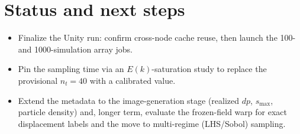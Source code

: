 \documentclass[11pt]{article}
\begin{document}
\section*{Status and next steps}
\begin{itemize}
  \item Finalize the Unity run: confirm cross-node cache reuse, then launch the
        100- and 1000-simulation array jobs.
  \item Pin the sampling time via an $E(k)$-saturation study to replace the
        provisional $n_t=40$ with a calibrated value.
  \item Extend the metadata to the image-generation stage (realized $dp$, $s_{\max}$,
        particle density) and, longer term, evaluate the frozen-field warp for exact
        displacement labels and the move to multi-regime (LHS/Sobol) sampling.
\end{itemize}
\end{document}
